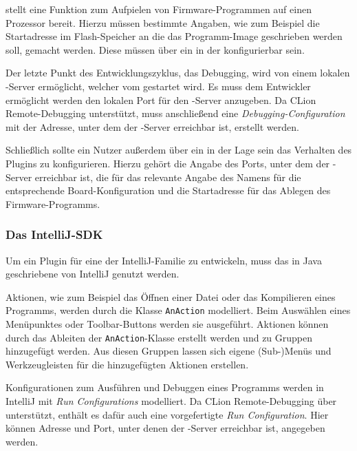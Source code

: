          stellt eine Funktion zum Aufpielen von Firmware-Programmen auf einen Prozessor bereit. Hierzu müssen
        bestimmte Angaben, wie zum Beispiel die Startadresse im Flash-Speicher an die das Programm-Image geschrieben
        werden soll, gemacht werden. Diese müssen über ein  in der  konfigurierbar sein.

        Der letzte Punkt des Entwicklungszyklus, das Debugging, wird von einem lokalen -Server ermöglicht, welcher
        vom  gestartet wird. Es muss dem Entwickler ermöglicht werden den lokalen Port für den -Server
        anzugeben. Da CLion Remote-Debugging unterstützt, muss anschließend eine \textit{Debugging-Configuration}
        mit der Adresse, unter dem der -Server erreichbar ist, erstellt werden.

        Schließlich sollte ein Nutzer außerdem über ein  in der Lage sein das Verhalten des Plugins zu
        konfigurieren. Hierzu gehört die Angabe des Ports, unter dem der -Server erreichbar ist, die für das
         relevante Angabe des Namens für die entsprechende Board-Konfiguration und die Startadresse für das
        Ablegen des Firmware-Programms.

        \subsubsection{Das IntelliJ-SDK}
        \label{sec:sdk}
        Um ein Plugin für eine  der IntelliJ-Familie zu entwickeln, muss das in Java geschriebene
         von IntelliJ genutzt werden.

        Aktionen, wie zum Beispiel das Öffnen einer Datei oder das Kompilieren eines Programms, werden durch die
        Klasse \texttt{AnAction} modelliert. Beim Auswählen eines Menüpunktes oder Toolbar-Buttons werden sie
        ausgeführt. Aktionen können durch das Ableiten der \texttt{AnAction}-Klasse erstellt
        werden und zu Gruppen hinzugefügt werden. Aus diesen Gruppen lassen sich eigene (Sub-)Menüs und Werkzeugleisten
        für die hinzugefügten Aktionen erstellen.

        Konfigurationen zum Ausführen und Debuggen eines Programms werden in IntelliJ mit \textit{Run Configurations}
        modelliert. Da CLion Remote-Debugging über  unterstützt, enthält es dafür auch eine vorgefertigte
        \textit{Run Configuration}. Hier können Adresse und Port, unter denen der -Server erreichbar ist, angegeben
        werden.

